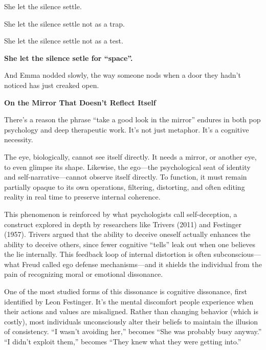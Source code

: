 She let the silence settle. 

She let the silence settle not as a trap.  

She let the silence settle not as a test. 

\textbf{She let the silence setle for ``space''.} 

And Emma nodded slowly, the way someone nods when a door they hadn’t noticed has just creaked open.

\begin{PsychologicalSidebar}{\textbf{On the Mirror That Doesn't Reflect Itself}}

  There’s a reason the phrase ``take a good look in the mirror'' endures in both pop psychology and deep therapeutic 
  work. It’s not just metaphor. It’s a cognitive necessity.

\medskip
  
  The eye, biologically, cannot see itself directly. It needs a mirror, or another eye, to even glimpse its shape. 
  Likewise, the ego—the psychological seat of identity and self-narrative—cannot observe itself directly. To function, 
  it must remain partially opaque to its own operations, filtering, distorting, and often editing reality in real 
  time to preserve internal coherence.

\medskip
  
  This phenomenon is reinforced by what psychologists call self-deception, a construct explored in depth by researchers 
  like Trivers (2011) and Festinger (1957). Trivers argued that the ability to deceive oneself actually enhances the 
  ability to deceive others, since fewer cognitive ``tells'' leak out when one believes the lie internally. This feedback 
  loop of internal distortion is often subconscious—what Freud called ego defense mechanisms—and it shields the 
  individual from the pain of recognizing moral or emotional dissonance.

\medskip
  
  One of the most studied forms of this dissonance is cognitive dissonance, first identified by Leon Festinger. It’s the 
  mental discomfort people experience when their actions and values are misaligned. Rather than changing behavior (which 
  is costly), most individuals unconsciously alter their beliefs to maintain the illusion of consistency. ``I wasn’t 
  avoiding her,'' becomes ``She was probably busy anyway.'' ``I didn’t exploit them,'' becomes ``They knew what they 
  were getting into.''

\medskip
  

\end{PsychologicalSidebar}
